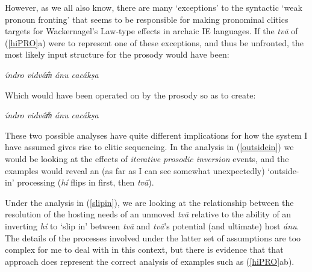 \documentclass[output=paper,
modfonts
]{LSP/langsci}
\begin{document}
However, as we all also know, there are many `exceptions' to the syntactic `weak pronoun fronting' that seems
to be responsible for making pronominal clitics targets for Wackernagel's Law-type effects in archaic IE languages. If the
\textit{tvā} of (\ref{hiPRO}a) were to represent one of these exceptions, and thus be unfronted, the most likely input structure for the prosody would have been:


\begin{exe}
\ex\label{slipin}
{\ob} \textit{índro vidvā́m̐}{\cb} {\ob} {\textit{}} {\ob}\textit{ánu  cacákṣa}{\cb}{\cb}
\end{exe}

Which would have been operated on by the prosody so as to create:

\vspace*{1ex}
\begin{exe}\ex
{\ob} \textit{índro vidvā́m̐}{\cb} {\ob} {\textcolor{gray}{\textit{}}} {\ob}\textit{ánu   cacákṣa}{\cb}{\cb}  
\end{exe}

These two possible analyses have quite different implications for how the system I have assumed gives rise to
clitic sequencing. In the analysis in (\ref{outsidein}) we would be looking at the effects of \textit{iterative prosodic inversion}
events, and the examples would reveal an (as far as I can see somewhat unexpectedly) `outside-in' processing (\textit{hí} flips in 
first, then \textit{tvā}).

Under the analysis in (\ref{slipin}), we are looking at the relationship between the resolution of the hosting
needs of an unmoved \textit{tvā} relative to the ability of an inverting \textit{hí} to `slip in' between \textit{tvā}
and \textit{tvā}'s potential (and ultimate) host \textit{ánu}. 
The details of the processes involved under the latter set of assumptions are too complex for me to
deal with in this context, but there is evidence that that approach does represent the correct analysis of examples such
as (\ref{hiPRO}ab). 
\end{document}
